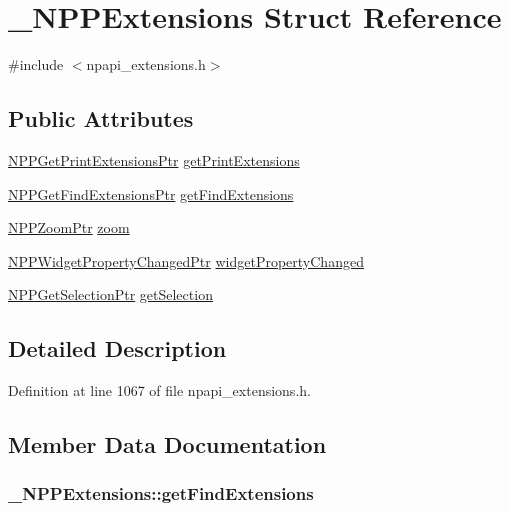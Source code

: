 \hypertarget{struct___n_p_p_extensions}{
\section{\_\-NPPExtensions Struct Reference}
\label{struct___n_p_p_extensions}
}


{\ttfamily \#include $<$npapi\_\-extensions.h$>$}

\subsection*{Public Attributes}
\begin{DoxyCompactItemize}
\item 
\hyperlink{npapi__extensions_8h_a42e6862ee4614a5f45e3158bf882b6ba}{NPPGetPrintExtensionsPtr} \hyperlink{struct___n_p_p_extensions_a21ea206ff20cb3c897fcb11fa262b3b4}{getPrintExtensions}
\item 
\hyperlink{npapi__extensions_8h_aeb4bff85058ef043c6c55eacdeb7fc08}{NPPGetFindExtensionsPtr} \hyperlink{struct___n_p_p_extensions_a03864b2c16eec21e2442aae19ef5e9cb}{getFindExtensions}
\item 
\hyperlink{npapi__extensions_8h_a9bb4d9f7a42a25495ba0046eabf49cf6}{NPPZoomPtr} \hyperlink{struct___n_p_p_extensions_a7fd866d61d275480af61b5d949b5a52d}{zoom}
\item 
\hyperlink{npapi__extensions_8h_a27a03ca543630aa9b10afb5a0d0c6bd7}{NPPWidgetPropertyChangedPtr} \hyperlink{struct___n_p_p_extensions_a5d699ab8f68df471355fb5f63f2ad763}{widgetPropertyChanged}
\item 
\hyperlink{npapi__extensions_8h_aedba5dce93f8bbc6144acce81353a1c8}{NPPGetSelectionPtr} \hyperlink{struct___n_p_p_extensions_aa0cff5c427406f7438b7442c69840a78}{getSelection}
\end{DoxyCompactItemize}


\subsection{Detailed Description}


Definition at line 1067 of file npapi\_\-extensions.h.



\subsection{Member Data Documentation}
\hypertarget{struct___n_p_p_extensions_a03864b2c16eec21e2442aae19ef5e9cb}{
\subsubsection[{getFindExtensions}]{ {\bf \_\-NPPExtensions::getFindExtensions}}}
\label{struct___n_p_p_extensions_a03864b2c16eec21e2442aae19ef5e9cb}


